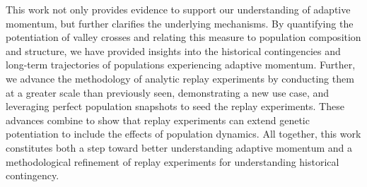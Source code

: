This work not only provides evidence to support our understanding of adaptive momentum, but further clarifies the underlying mechanisms. 
By quantifying the potentiation of valley crosses and relating this measure to population composition and structure, we have %
provided insights into the historical contingencies and long-term trajectories of populations experiencing adaptive momentum. 
Further, we advance the methodology of analytic replay experiments by conducting them at a greater scale than previously seen, demonstrating a new use case, and leveraging perfect population snapshots to seed the replay experiments. 
These advances combine to show that replay experiments can extend genetic potentiation to include the effects of population dynamics. 
All together, this work constitutes both a step toward better understanding adaptive momentum and a methodological refinement of replay experiments for understanding historical contingency.















